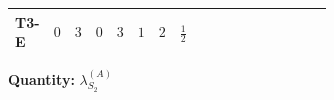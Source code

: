 \documentclass[8pt]{article}
\begin{document}
\begin{landscape}
\begin{longtable}{@{}llcccccc >{\raggedright\arraybackslash}p{0.21\linewidth} >{\raggedright\arraybackslash}p{0.21\linewidth} >{\raggedright\arraybackslash}p{0.21\linewidth}@{}}
\midrule
T3-E & $0$ & $3$ & $0$ & $3$ & $1$ & $2$ & $\frac{1}{2}$ & \scriptsize\adjustbox{max width=\linewidth}{$\begin{gathered} +\frac{3 {g_2}^4}{4}\end{gathered}$} & \scriptsize\adjustbox{max width=\linewidth}{$\begin{gathered} +{g_1}^2 \left(9 {g_2}^2-\frac{3 {\lambda_{S_2}^{(1)}}}{2}-12 {\lambda_{S_2}^{(A)}}\right)\end{gathered}$} & \scriptsize\adjustbox{max width=\linewidth}{$\begin{gathered} +{g_2}^2 (-3 {\lambda_{S_2}^{(1)}}-24 {\lambda_{S_2}^{(A)}})\end{gathered}$} \\
\midrule
\bottomrule
\end{longtable}
\clearpage
\noindent\textbf{Quantity: }$\lambda_{S_2}^{(A)}$\par\smallskip

\end{landscape}
\end{document}
